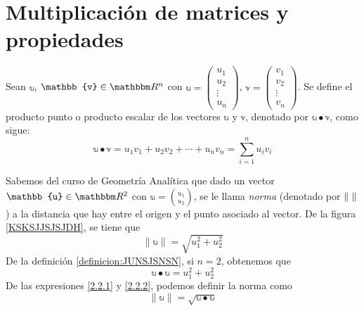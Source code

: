 \section{Multiplicación de matrices y propiedades}

\begin{definition}\label{definicion:JUNSJSNSN}
    Sean $\mathbb{u}$, $\mathbb{v} \in \RR[n]$ con $\mathbb{u} = \begin{pmatrix}
        u_1 \\
        u_2 \\
        \vdots \\
        u_n
    \end{pmatrix}$, $\mathbb{v} = \begin{pmatrix}
        v_1 \\
        v_2 \\
        \vdots \\
        v_n
    \end{pmatrix}$. Se define el producto punto o producto escalar de los vectores $\mathbb{u}$ y $\mathbb{v}$, denotado por $\mathbb{u} \bullet \mathbb{v}$, como sigue:
    $$\mathbb{u} \bullet \mathbb{v} = u_1v_1 + u_2v_2 + \cdots + u_nv_n = \sum_{i=1}^{n} u_iv_i$$
\end{definition}

\begin{observation}
    Sabemos del curso de Geometría Analítica que dado un vector $\mathbb{u} \in \RR[2]$ con $\displaystyle \mathbb{u} = \binom{u_1}{u_2}$, se le llama \emph{norma} (denotado por $\| \hspace{1mm} \|$) a la distancia que hay entre el origen y el punto asociado al vector. De la figura \ref{KSKSJJSJSJDH}, se tiene que
    \begin{equation}
        \|\mathbb{u}\| = \sqrt{u_1^2+u_2^2} \label{2.2.1}
    \end{equation}
    De la definición \ref{definicion:JUNSJSNSN}, si $n = 2$, obtenemos que
    \begin{equation}
        \mathbb{u} \bullet \mathbb{u} = u_1^2 + u_2^2 \label{2.2.2}
    \end{equation}
    De las expresiones \eqref{2.2.1} y \eqref{2.2.2}, podemos definir la norma como
    $$\|\mathbb{u}\| = \sqrt{\mathbb{u} \bullet \mathbb{u}}$$
\end{observation}

